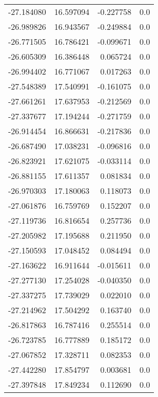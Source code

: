 \begin{tabular}{rrrr}
      -27.184080 &        16.597094 &   -0.227758 &   0.0 \\
      -26.989826 &        16.943567 &   -0.249884 &   0.0 \\
      -26.771505 &        16.786421 &   -0.099671 &   0.0 \\
      -26.605309 &        16.386448 &    0.065724 &   0.0 \\
      -26.994402 &        16.771067 &    0.017263 &   0.0 \\
      -27.548389 &        17.540991 &   -0.161075 &   0.0 \\
      -27.661261 &        17.637953 &   -0.212569 &   0.0 \\
      -27.337677 &        17.194244 &   -0.271759 &   0.0 \\
      -26.914454 &        16.866631 &   -0.217836 &   0.0 \\
      -26.687490 &        17.038231 &   -0.096816 &   0.0 \\
      -26.823921 &        17.621075 &   -0.033114 &   0.0 \\
      -26.881155 &        17.611357 &    0.081834 &   0.0 \\
      -26.970303 &        17.180063 &    0.118073 &   0.0 \\
      -27.061876 &        16.759769 &    0.152207 &   0.0 \\
      -27.119736 &        16.816654 &    0.257736 &   0.0 \\
      -27.205982 &        17.195688 &    0.211950 &   0.0 \\
      -27.150593 &        17.048452 &    0.084494 &   0.0 \\
      -27.163622 &        16.911644 &   -0.015611 &   0.0 \\
      -27.277130 &        17.254028 &   -0.040350 &   0.0 \\
      -27.337275 &        17.739029 &    0.022010 &   0.0 \\
      -27.214962 &        17.504292 &    0.163740 &   0.0 \\
      -26.817863 &        16.787416 &    0.255514 &   0.0 \\
      -26.723785 &        16.777889 &    0.185172 &   0.0 \\
      -27.067852 &        17.328711 &    0.082353 &   0.0 \\
      -27.442280 &        17.854797 &    0.003681 &   0.0 \\
      -27.397848 &        17.849234 &    0.112690 &   0.0 \\

\end{tabular}
